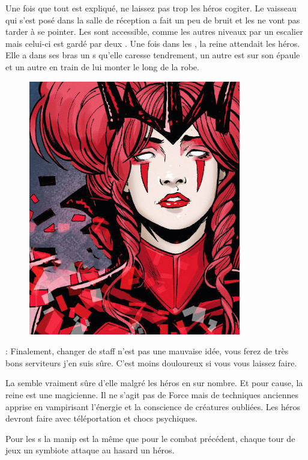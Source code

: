 Une fois que tout est expliqué, ne laissez pas trop les héros cogiter. Le vaisseau qui s’est posé dans la salle de réception a fait un peu de bruit et les  ne vont pas tarder à se pointer.
\bigbreak
Les  sont accessible, comme les autres niveaux par un escalier mais celui-ci est gardé par deux . Une fois dans les , la reine attendait les héros. Elle a dans ses bras un s qu’elle caresse tendrement, un autre est sur son épaule et un autre en train de lui monter le long de la robe.

\begin{figure}[h]
\noindent\includegraphics[width=\linewidth]{_img/pnjs/ktath-atn-queen-fight.jpg}
\end{figure}
\begin{quotebox}
\noindent\textbf{}: Finalement, changer de staff n’est pas une mauvaise idée, vous ferez de très bons serviteurs j’en suis sûre. C’est moins douloureux si vous vous laissez faire.
\end{quotebox}

La  semble vraiment sûre d’elle malgré les héros en sur nombre. Et pour cause, la reine est une magicienne. Il ne s’agit pas de Force mais de techniques anciennes apprise en vampirisant l’énergie et la conscience de créatures oubliées. Les héros devront faire avec téléportation et chocs psychiques.

Pour les s la manip est la même que pour le combat précédent, chaque tour de jeux un symbiote attaque au hasard un héros.